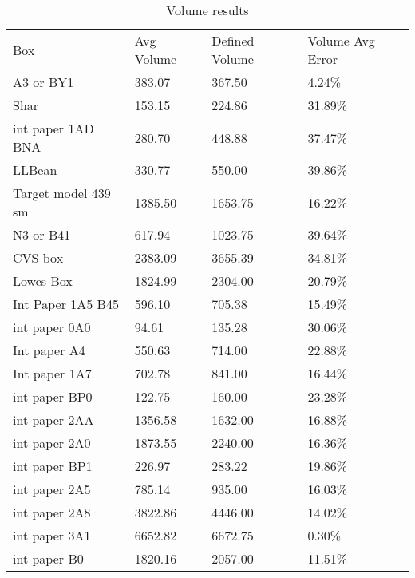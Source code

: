 \documentclass[11pt, twoside, reqno]{book}
\begin{document}
\begin{table}[]
	\centering

	\label{AR2E}
	\begin{tabular}{llll}
		Box                 & Avg Volume & Defined Volume & Volume Avg Error \\
		A3 or BY1           & 383.07     & 367.50         & 4.24\%           \\
		Shar                & 153.15     & 224.86         & 31.89\%          \\
		int paper 1AD BNA   & 280.70     & 448.88         & 37.47\%          \\
		LLBean              & 330.77     & 550.00         & 39.86\%          \\
		Target model 439 sm & 1385.50    & 1653.75        & 16.22\%          \\
		N3 or B41           & 617.94     & 1023.75        & 39.64\%          \\
		CVS box             & 2383.09    & 3655.39        & 34.81\%          \\
		Lowes Box           & 1824.99    & 2304.00        & 20.79\%          \\
		Int Paper 1A5 B45   & 596.10     & 705.38         & 15.49\%          \\
		int paper 0A0       & 94.61      & 135.28         & 30.06\%          \\
		Int paper A4        & 550.63     & 714.00         & 22.88\%          \\
		Int paper 1A7       & 702.78     & 841.00         & 16.44\%          \\
		int paper BP0       & 122.75     & 160.00         & 23.28\%          \\
		int paper 2AA       & 1356.58    & 1632.00        & 16.88\%          \\
		int paper 2A0       & 1873.55    & 2240.00        & 16.36\%          \\
		int paper BP1       & 226.97     & 283.22         & 19.86\%          \\
		int paper 2A5       & 785.14     & 935.00         & 16.03\%          \\
		int paper 2A8       & 3822.86    & 4446.00        & 14.02\%          \\
		int paper 3A1       & 6652.82    & 6672.75        & 0.30\%           \\
		int paper B0        & 1820.16    & 2057.00        & 11.51\%         
	\end{tabular}
\caption{Volume results}
\end{table}
\end{document}
